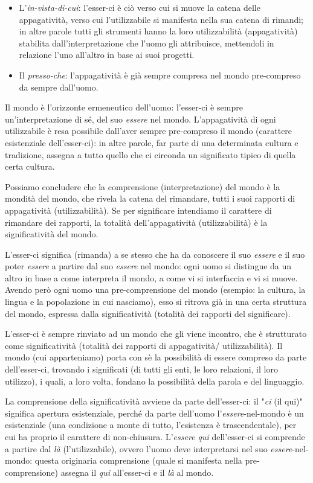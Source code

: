 \documentclass[a4paper,12pt,oneside]{article}%
\begin{document}
\begin{itemize}
	\item L'\textit{in-vista-di-cui}: l'esser-ci è ciò verso cui si muove la catena delle appagatività, verso cui l'utilizzabile si manifesta nella sua catena di rimandi; in altre parole tutti gli strumenti hanno la loro utilizzabilità (appagatività) stabilita dall'interpretazione che l'uomo gli attribuisce, mettendoli in relazione l'uno all'altro in base ai suoi progetti.
	\item Il \textit{presso-che}: l'appagatività è già sempre compresa nel mondo pre-compreso da sempre dall'uomo.
\end{itemize} 

Il mondo è l'orizzonte ermeneutico dell'uomo: l'esser-ci è sempre un'interpretazione di sé, del suo \textit{essere} nel mondo. L'appagatività di ogni utilizzabile è resa possibile dall'aver sempre pre-compreso il mondo (carattere esistenziale dell'esser-ci): in altre parole, far parte di una determinata cultura e tradizione, assegna a tutto quello che ci circonda un significato tipico di quella certa cultura.

Possiamo concludere che la comprensione (interpretazione) del mondo è la mondità del mondo, che rivela la catena del rimandare, tutti i suoi rapporti di appagatività (utilizzabilità). Se per significare intendiamo il carattere di rimandare dei rapporti, la totalità dell'appagatività (utilizzabilità) è la significatività del mondo.

L'esser-ci significa (rimanda) a se stesso che ha da conoscere il suo \textit{essere} e il suo poter \textit{essere} a partire dal suo \textit{essere} nel mondo: ogni uomo si distingue da un altro in base a come interpreta il mondo, a come vi si interfaccia e vi si muove. Avendo però ogni uomo una pre-comprensione del mondo (esempio: la cultura, la lingua e la popolazione in cui nasciamo), esso si ritrova già in una certa struttura del mondo, espressa dalla significatività (totalità dei rapporti del significare).

L'esser-ci è sempre rinviato ad un mondo che gli viene incontro, che è strutturato come significatività (totalità dei rapporti di appagatività/ utilizzabilità). Il mondo (cui apparteniamo) porta con sè la possibilità di essere compreso da parte dell'esser-ci, trovando i significati (di tutti gli enti, le loro relazioni, il loro utilizzo), i quali, a loro volta, fondano la possibilità della parola e del linguaggio.

La comprensione della significatività avviene da parte dell'esser-ci: il "\textit{ci} (il qui)" significa apertura esistenziale, perché da parte dell'uomo l'\textit{essere}-nel-mondo è un esistenziale (una condizione a monte di tutto, l'esistenza è trascendentale), per cui ha proprio il carattere di non-chiusura. L'\textit{essere qui} dell'esser-ci si comprende a partire dal \textit{là} (l'utilizzabile), ovvero l'uomo deve interpretarsi nel suo \textit{essere}-nel-mondo: questa originaria comprensione (quale si manifesta nella pre-comprensione) assegna il \textit{qui} all'esser-ci e il \textit{là} al mondo.
\end{document}
